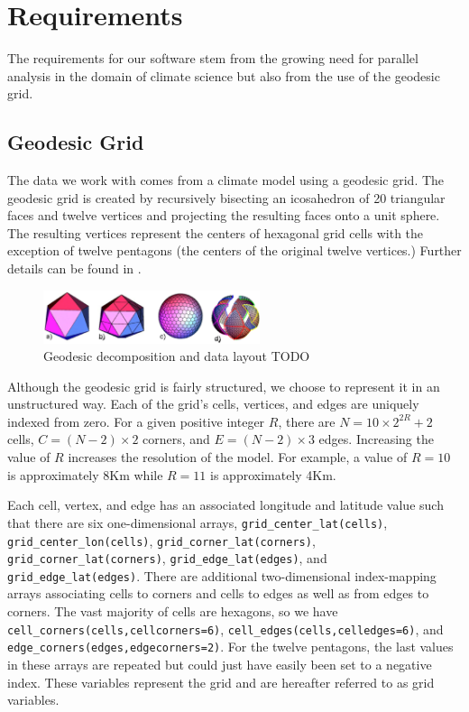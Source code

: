 \section{Requirements}
\label{section:requirements}

The requirements for our software stem from the growing need for parallel
analysis in the domain of climate science\cite{MODSIM07:LOT} but also from
the use of the geodesic grid.

\subsection{Geodesic Grid}

The data we work with comes from a climate model using a geodesic grid.  The
geodesic grid is created by recursively bisecting an icosahedron of 20
triangular faces and twelve vertices and projecting the resulting faces onto
a unit sphere.  The resulting vertices represent the centers of hexagonal grid
cells with the exception of twelve pentagons (the centers of the original
twelve vertices.)  Further details can be found in \cite{GEODESIC}.

\begin{figure}[!t]
\includegraphics[width=2.5in]{images/geodesic.eps}
\caption{Geodesic decomposition and data layout TODO}
\label{fig:geodesic}
\end{figure}

Although the geodesic grid is fairly structured, we choose to represent it in
an unstructured way.  Each of the grid's cells, vertices, and edges are
uniquely indexed from zero.  For a given positive integer $R$, there are $N =
10 \times 2^{2R} + 2$ cells, $C = (N-2) \times 2$ corners, and $E = (N-2)
\times 3$ edges.  Increasing the value of $R$ increases the resolution of the
model.  For example, a value of $R=10$ is approximately 8Km while $R=11$ is
approximately 4Km.

Each cell, vertex, and edge has an associated longitude and latitude value
such that there are six one-dimensional arrays, \verb=grid_center_lat(cells)=,
\verb=grid_center_lon(cells)=, \verb=grid_corner_lat(corners)=,
\verb=grid_corner_lat(corners)=, \verb=grid_edge_lat(edges)=, and
\verb=grid_edge_lat(edges)=.  There are additional two-dimensional
index-mapping arrays associating cells to corners and cells to edges as well
as from edges to corners.  The vast majority of cells are hexagons, so we have
\verb+cell_corners(cells,cellcorners=6)+,
\verb+cell_edges(cells,celledges=6)+, and
\verb+edge_corners(edges,edgecorners=2)+.  For the twelve pentagons, the last
values in these arrays are repeated but could just have easily been set to a
negative index.  These variables represent the grid and are hereafter referred
to as grid variables.

